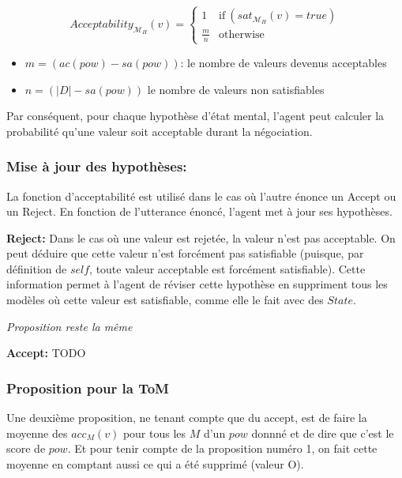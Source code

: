 \documentclass{llncs}
\begin{document}
	\begin{equation}
	Acceptability_{\mathcal{M}_H}(v) =  \left\{\begin{array}{ll}
	1 & \mathrm{if\ } (sat_{\mathcal{M}_H}(v) = true)\\
	\frac{m}{n} & \mathrm{otherwise}
	\end{array}\right.
	\end{equation}
	\begin{itemize}
		\item $m= (ac(pow) - sa(pow)) $: le nombre de valeurs devenus acceptables
		\item $n= (|D| - sa(pow)) $ le nombre de valeurs non satisfiables
	\end{itemize}
	
	Par conséquent, pour chaque hypothèse d'état mental, l'agent peut calculer la probabilité qu'une valeur soit acceptable durant la négociation.
	
	\subsubsection{Mise à jour des hypothèses:}
		La fonction d'acceptabilité est utilisé dans le cas où l'autre énonce un Accept ou un Reject. En fonction de l'utterance énoncé, l'agent met à jour ses hypothèses. 
		
		\textbf{Reject:} Dans le cas où une valeur est rejetée, la valeur n'est pas acceptable. On peut déduire que cette valeur n'est forcément pas satisfiable (puisque, par définition de $self$, toute valeur acceptable est forcément satisfiable). Cette information permet à l'agent de réviser cette hypothèse en suppriment tous les modèles où cette valeur est satisfiable, comme elle le fait avec des $State$.
		
		\emph{Proposition reste la même}
		
		\textbf{Accept:} TODO
%	

	\subsubsection{Proposition pour la ToM}
	Une deuxième proposition, ne tenant compte que du accept, est de faire la moyenne des $acc_{M}(v)$ pour tous les $M$ d'un $pow$ donnné et de dire que c'est le score de $pow$. Et pour tenir compte de la proposition numéro 1, on fait cette moyenne en comptant aussi ce qui a été supprimé (valeur O).
	
\end{document}
